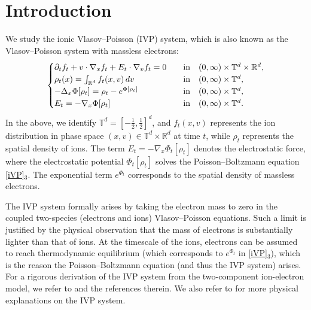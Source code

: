 \documentclass[11pt,reqno,a4paper]{amsart}
\newcommand{\R}{\mathbb{R}}
\newcommand{\p}{\partial}
\theoremstyle{definition}
\theoremstyle{remark}
\numberwithin{equation}{section}
\newcommand{\T} {\mathbb T}
\newcommand{\lt}{\left}
\newcommand{\rt}{\right}
\newcommand{\dv}{\textnormal{d}v}
\begin{document}
\section{Introduction}
We study the ionic Vlasov--Poisson (IVP) system, which is also known as the Vlasov--Poisson system with massless electrons:
\begin{align}
\label{iVP}
\begin{cases}
    \p_t f_t + v \cdot \nabla_x f_t+ E_t \cdot \nabla_v f_t = 0 \quad &\text{in}\quad(0,\infty)\times\T^d\times\R^d,\\
    \rho_t(x) = \int_{\R^d} f_t(x,v)\,\dv \quad &\text{in}\quad(0,\infty)\times\T^d,\\
     -\Delta_x \Phi[\rho_t] = \rho_t - e^{\Phi[\rho_t]}\quad &\text{in}\quad(0,\infty)\times\T^d,\\
    E_t = - \nabla_x \Phi[\rho_t] &\text{in}\quad(0,\infty)\times\T^d.\\
\end{cases}
\end{align}
In the above, we identify $\T^d = \lt[-\frac{1}{2},\frac{1}{2}\rt]^d$, and $f_t(x,v)$ represents the ion distribution in phase space $(x,v)\in \T^d \times\R^d$ at time $t$, while $\rho_t$ represents the spatial density of ions. The term $E_t=-\nabla_x \Phi_t[\rho_t]$ denotes the electrostatic force, where the electrostatic potential $\Phi_t[\rho_t]$ solves the Poisson--Boltzmann equation \eqref{iVP}$_{3}$. The exponential term $e^{\Phi_t}$ corresponds to the spatial density of massless electrons.


 
The IVP system formally arises by taking the electron mass to zero in the coupled two-species (electrons and ions) Vlasov--Poisson equations. Such a limit is justified by the physical observation that the mass of electrons is substantially lighter than that of ions.
At the timescale of the ions, electrons can be assumed to reach thermodynamic equilibrium (which corresponds to $e^{\Phi_t}$ in \eqref{iVP}$_{3}$), which is the reason the Poisson--Boltzmann equation (and thus the IVP system) arises. For a rigorous derivation of the IVP system from the two-component ion-electron model, we refer to \cite{bardosgolsenguyensentis2018,flynnguo2024} and the references therein. We also refer to \cite{ griffinpickeringiacobelli2021Torus, griffinpickeringiacobelli2021Recent,hankwan2011} for more
physical explanations on the IVP system. 
\end{document}
